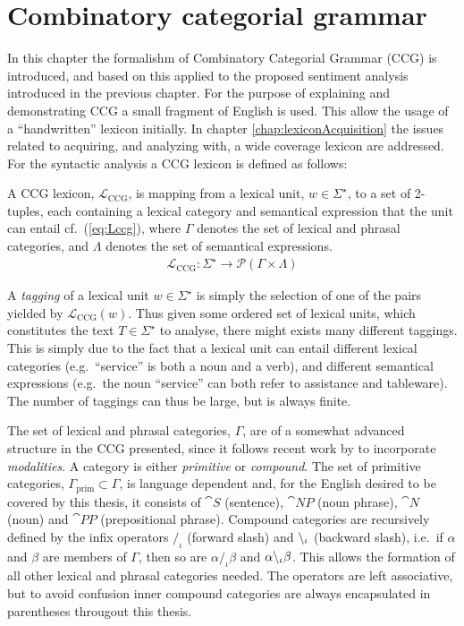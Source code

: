 
\chapter{Combinatory categorial grammar}
\label{chap:CCG}

In this chapter the formalishm of Combinatory Categorial Grammar (CCG) is introduced, and based on this applied to the proposed sentiment analysis introduced in the previous chapter. For the purpose of explaining and demonstrating CCG a small fragment of English is used. This allow the usage of a ``handwritten'' lexicon initially. In chapter \ref{chap:lexiconAcquisition} the issues related to acquiring, and analyzing with, a wide coverage lexicon are addressed. For the syntactic analysis a CCG lexicon is defined as follows:

\begin{definition}
A CCG lexicon, $\mathcal{L}_\mathrm{CCG}$, is mapping from a lexical unit, $w \in \Sigma^\star$, to a set of 2-tuples, each containing a lexical category and semantical expression that the unit can entail cf.\ (\ref{eq:Lccg}), where $\Gamma$ denotes the set of lexical and phrasal categories, and $\Lambda$ denotes the set of semantical expressions.
\begin{align}
 \mathcal{L}_\mathrm{CCG}: \Sigma^\star \to \mathcal{P}(\Gamma \times \Lambda)
 \label{eq:Lccg}
\end{align}
\end{definition}

A \emph{tagging} of a lexical unit $w \in \Sigma^\star$ is simply the selection of one of the pairs yielded by $\mathcal{L}_\mathrm{CCG}(w)$. Thus given some ordered set of lexical units, which constitutes the text $T \in \Sigma^\star$ to analyse, there might exists many different taggings. This is simply due to the fact that a lexical unit can entail different lexical categories (e.g.\ ``service'' is both a noun and a verb), and different semantical expressions (e.g.\ the noun ``service'' can both refer to assistance and tableware). The number of taggings can thus be large, but is always finite.

The set of lexical and phrasal categories, $\Gamma$, are of a somewhat advanced structure in the CCG presented, since it follows recent work by \citeauthor{multiModalCCG}  to incorporate \emph{modalities}. A category is either \emph{primitive} or \emph{compound}. The set of primitive categories, $\Gamma_\mathrm{prim} \subset \Gamma$, is language dependent and, for the English desired to be covered by this thesis, it consists of $\cat{S}$ (sentence), $\cat{NP}$ (noun phrase), $\cat{N}$ (noun) and $\cat{PP}$ (prepositional phrase). Compound categories are recursively defined by the infix operators $/_\iota$ (forward slash) and $\backslash_\iota$ (backward slash), i.e.\ if $\alpha$ and $\beta$ are members of $\Gamma$, then so are $\alpha/_\iota\beta$ and $\alpha \backslash_\iota \beta$. This allows the formation of all other lexical and phrasal categories needed. The operators are left associative, but to avoid confusion inner compound categories are always encapsulated in parentheses througout this thesis.

